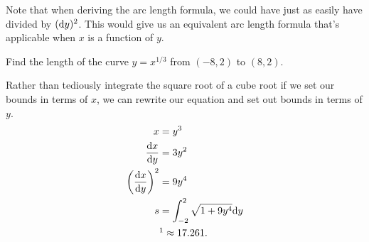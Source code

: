\noindent
Note that when deriving the arc length formula, we could have just as easily have divided by $(\mathrm{d} y)^2$.
This would give us an equivalent arc length formula that's applicable when $x$ is a function of $y$.

\begin{example}
	Find the length of the curve $y=x^{1/3}$ from $(-8,2)$ to $(8,2)$.
\end{example}
Rather than  tediously integrate the square root of a cube root if we set our bounds in terms of $x$, we can rewrite our equation and set out bounds in terms of $y$.
\begin{align*}
	x &= y^3 \\
	\dd{x}{y} &= 3y^2 \\
	\left(\dd{x}{y}\right)^2 &= 9y^4 \\
	s &= \int_{-2}^{2}{\sqrt{1+9y^4}\d{y}} \\
	&\footnotemark\approx 17.261.
\end{align*}
